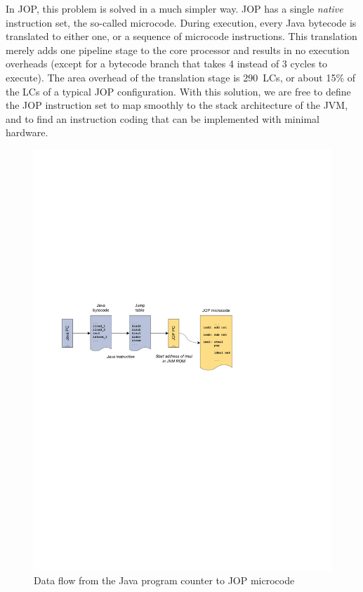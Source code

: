 In JOP, this problem is solved in a much simpler way. JOP has a
single \emph{native} instruction set, the so-called microcode.
During execution, every Java bytecode is translated to either one,
or a sequence of microcode instructions. This translation merely
adds one pipeline stage to the core processor and results in no
execution overheads (except for a bytecode branch that takes 4
instead of 3 cycles to execute). The area overhead of the
translation stage is 290~LCs, or about 15\% of the LCs of a typical
JOP configuration. With this solution, we are free to define the JOP
instruction set to map smoothly to the stack architecture of the
JVM, and to find an instruction coding that can be implemented with
minimal hardware.

\begin{figure}
    \centering
    \includegraphics{arch/arch_indirection}
    \caption{Data flow from the Java program counter to JOP microcode}
    \label{fig_arch_data_flow}
\end{figure}


